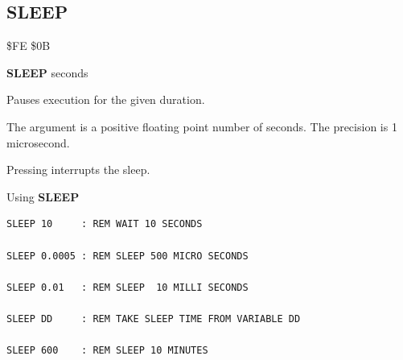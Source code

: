 \subsection{SLEEP}
\begin{description}[leftmargin=2cm,style=nextline]
\item [Token:]    \$FE \$0B

\item [Format:]   {\bf SLEEP} seconds

\item [Usage:]    Pauses execution for the given duration.

                  The argument is a positive floating point number of seconds. The precision is 1 microsecond.

\item [Remarks:]  Pressing  interrupts the sleep.

\item [Examples:] Using {\bf SLEEP}

\begin{tcolorbox}[colback=black,coltext=white]
\verbatimfont{\codefont}
\begin{verbatim}
SLEEP 10     : REM WAIT 10 SECONDS

SLEEP 0.0005 : REM SLEEP 500 MICRO SECONDS

SLEEP 0.01   : REM SLEEP  10 MILLI SECONDS

SLEEP DD     : REM TAKE SLEEP TIME FROM VARIABLE DD

SLEEP 600    : REM SLEEP 10 MINUTES
\end{verbatim}
\end{tcolorbox}
\end{description}


\newpage
